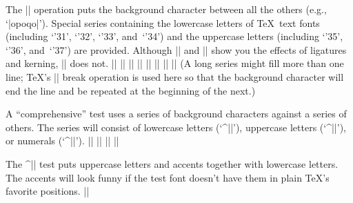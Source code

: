 The |\series| operation puts the background character between all the
others (e.g., `|opoqo|'). Special series containing the lowercase
letters of \TeX\ text fonts (including `\char'31', `\char'32',
`\char'33', and~`\char'34') and the uppercase letters (including
`\char'35', `\char'36', and~`\char'37') are provided.
Although |\mixture| and |\alternation| show you the effects of
ligatures and kerning, |\series| does not.
\beginlines
|\def\!{\discretionary{\background}{\background}{\background}}|
|\def\series{\promptthree \!\doseries\starting\ending\par}|
|\def\doseries#1#2{\n=#1\loop\char\n\!\ifnum\n<#2\advance\n 1 \repeat}|
|\def\complower{\!\doseries{`a}{`z}\doseries{'31}{'34}\par}|
|\def\compupper{\!\doseries{`A}{`Z}\doseries{'35}{'37}\par}|
|\def\compdigs{\!\doseries{`0}{`9}\par}|
|\def\alphabet{\setchar\background\complower}|
|\def\ALPHABET{\setchar\background\compupper}|
\endlines
(A long series might fill more than one line; \TeX's |\discretionary|
break operation is used here so that the background character will end
the line and be repeated at the beginning of the next.)

A ``comprehensive'' test uses a series of background characters
against a series of others. The series will consist of lowercase
letters (`^|\lowers|'), uppercase letters (`^|\uppers|'), or
numerals (`^|\digits|').
\beginlines
|\def\lowers{\docomprehensive\complower{`a}{`z}{'31}{'34}}|
|\def\uppers{\docomprehensive\compupper{`A}{`Z}{'35}{'37}}|
|\def\digits{\docomprehensive\compdigs{`0}{`4}{`5}{`9}}|
|\def\docomprehensive#1#2#3#4#5{\par\chardef\background=#2|
|  \loop{#1} \ifnum\background<#3\m=\background\advance\m 1|
|  \chardef\background=\m \repeat \chardef\background=#4|
|  \loop{#1} \ifnum\background<#5\m=\background\advance\m 1|
|  \chardef\background=\m \repeat}|
\endlines

The ^|\names| test puts uppercase letters and accents
together with lowercase letters. The accents will look funny
if the test font doesn't have them in plain \TeX's favorite positions.
\beginlines
|\def\names{ {\AA}ngel\aa\ Beatrice Claire|
|  Diana \'Erica Fran\c{c}oise Ginette H\'el\`ene Iris|
|  Jackie K\=aren {\L}au\.ra Mar{\'\i}a N\H{a}ta{\l}{\u\i}e {\O}ctave|
|  Pauline Qu\^eneau Roxanne Sabine T\~a{\'\j}a Ur\v{s}ula|
|  Vivian Wendy Xanthippe Yv{\o}nne Z\"azilie\par}|
\endlines

